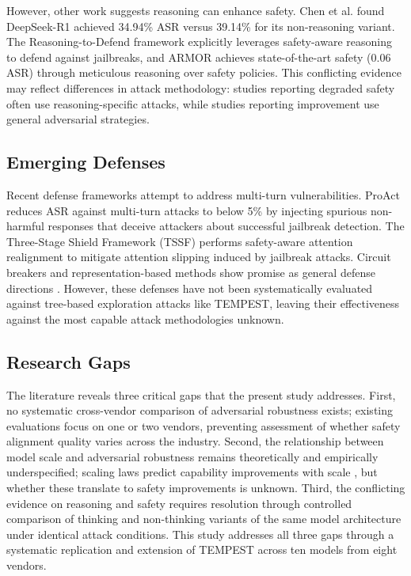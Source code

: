 \documentclass[11pt,a4paper]{article}
\begin{document}
However, other work suggests reasoning can enhance safety. Chen et al. \cite{chen2025weakestlink} found DeepSeek-R1 achieved 34.94\% ASR versus 39.14\% for its non-reasoning variant. The Reasoning-to-Defend framework \cite{cao2025r2d} explicitly leverages safety-aware reasoning to defend against jailbreaks, and ARMOR \cite{xie2025armor} achieves state-of-the-art safety (0.06 ASR) through meticulous reasoning over safety policies. This conflicting evidence may reflect differences in attack methodology: studies reporting degraded safety often use reasoning-specific attacks, while studies reporting improvement use general adversarial strategies.

\subsection{Emerging Defenses}

Recent defense frameworks attempt to address multi-turn vulnerabilities. ProAct \cite{liu2025proact} reduces ASR against multi-turn attacks to below 5\% by injecting spurious non-harmful responses that deceive attackers about successful jailbreak detection. The Three-Stage Shield Framework (TSSF) \cite{wang2025tssf} performs safety-aware attention realignment to mitigate attention slipping induced by jailbreak attacks. Circuit breakers and representation-based methods show promise as general defense directions \cite{andriushchenko2024jailbreaking}. However, these defenses have not been systematically evaluated against tree-based exploration attacks like TEMPEST, leaving their effectiveness against the most capable attack methodologies unknown.

\subsection{Research Gaps}

The literature reveals three critical gaps that the present study addresses. First, no systematic cross-vendor comparison of adversarial robustness exists; existing evaluations focus on one or two vendors, preventing assessment of whether safety alignment quality varies across the industry. Second, the relationship between model scale and adversarial robustness remains theoretically and empirically underspecified; scaling laws predict capability improvements with scale \cite{kaplan2020scaling}, but whether these translate to safety improvements is unknown. Third, the conflicting evidence on reasoning and safety requires resolution through controlled comparison of thinking and non-thinking variants of the same model architecture under identical attack conditions. This study addresses all three gaps through a systematic replication and extension of TEMPEST across ten models from eight vendors.
\end{document}
